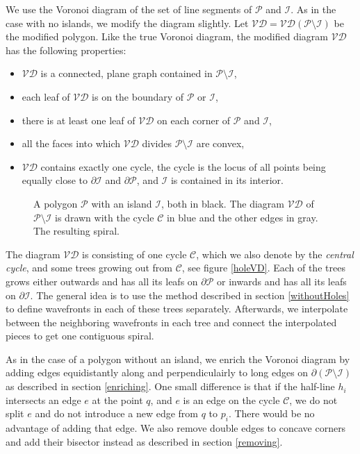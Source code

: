 \documentclass[3p]{elsarticle}
\newcommand{\VD}{\mathcal{VD}}
\newcommand{\PP}{\mathcal{P}}
\newcommand{\HH}{\mathcal{I}}
\newcommand{\CC}{\mathcal{C}}
\begin{document}
We use the Voronoi diagram of
the set of line segments of $\PP$ and $\HH$. As in the case with no islands, we modify the
diagram slightly. Let $\VD=\VD(\PP\setminus\HH)$ be the modified polygon. Like the true Voronoi diagram,
the modified diagram $\VD$ has the following properties:
\begin{itemize}
\setlength\itemsep{0em}
\item $\VD$ is a connected, plane graph contained in $\PP\setminus\HH$,
\item each leaf of $\VD$ is on the boundary of $\PP$ or $\HH$,
\item there is at least one leaf of $\VD$ on each corner of $\PP$ and $\HH$,
\item all the faces into which $\VD$ divides $\PP\setminus\HH$ are convex,
\item $\VD$ contains exactly one cycle,
the cycle is the locus of all points being equally close to $\partial\HH$ and $\partial\PP$, and
$\HH$ is contained in its interior.
\end{itemize}

\begin{figure*}
\centering
{}\quad
{}
\caption{
 A polygon $\PP$ with an island $\HH$, both in black.
The diagram $\VD$ of $\PP\setminus\HH$ is drawn with the cycle $\CC$ in blue
and the other edges in gray.
 The resulting spiral.
}
\label{spiralWithHole}
\end{figure*}

The diagram $\VD$ is consisting of one cycle $\CC$, which we also denote by the \emph{central cycle},
and some trees growing out from $\CC$, see figure \ref{holeVD}.
Each of the trees grows either outwards and has all
its leafs on $\partial\PP$
or inwards and has all its leafs on $\partial\HH$.
The general idea is to use the method described in section \ref{withoutHoles}
to define wavefronts in each of these trees separately. Afterwards, we interpolate between
the neighboring wavefronts in each tree and connect the interpolated pieces to get one
contiguous spiral.

As in the case of a polygon without an island,
we enrich the Voronoi diagram by adding edges equidistantly along and perpendiculairly to long
edges on $\partial(\PP\setminus\HH)$ as described in section \ref{enriching}.
One small difference is that if the half-line $h_i$ intersects an edge $e$ at the point
$q$, and $e$ is an edge on the cycle
$\CC$, we do not split $e$ and do not introduce a new edge from $q$ to $p_i$.
There would be no advantage of adding that edge.
We also remove double edges to concave corners and add their bisector instead
as described in section \ref{removing}.
\end{document}
